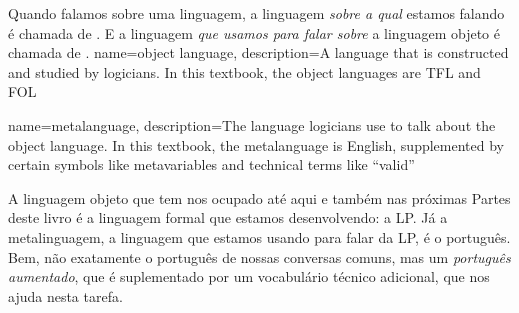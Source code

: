 Quando falamos sobre uma linguagem, a linguagem \emph{sobre a qual} estamos falando é chamada de .
E a linguagem \emph{que usamos para falar sobre} a linguagem objeto é chamada de .
\label{def.metalanguage}
{
name=object language,
description={A language that is constructed and studied by logicians. In this textbook,
 the object languages are TFL and FOL}
}

{
name=metalanguage,
description={The language logicians use to talk about the object language. In this textbook, the metalanguage is English, supplemented by certain symbols like metavariables and technical terms like ``valid''}
}

A linguagem objeto que tem nos ocupado até aqui e também nas próximas Partes deste livro é a linguagem formal que estamos desenvolvendo: a LP.
Já a metalinguagem, a linguagem que estamos usando para falar da LP, é o português.
Bem, não exatamente o português de nossas conversas comuns, mas um \emph{português aumentado}, que é suplementado por um vocabulário técnico adicional, que nos ajuda nesta tarefa.

